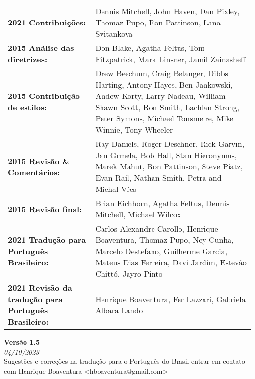 \begin{titlepage}
        \begin{tabular}{ p{6.5cm} p{11.5cm} }
            \textbf{2021 Contribuições:}	& Dennis Mitchell, John Haven, Dan Pixley, Thomaz Pupo, Ron Pattinson, Lana Svitankova \\
            \textbf{2015 Análise das diretrizes:} & Don Blake, Agatha Feltus, Tom Fitzpatrick, Mark Linsner, Jamil Zainasheff \\
            \textbf{2015 Contribuição de estilos:} & Drew Beechum, Craig Belanger, Dibbs Harting, Antony Hayes, Ben Jankowski, Andew Korty,
            Larry Nadeau, William Shawn Scott, Ron Smith, Lachlan Strong, Peter Symons, Michael Tonsmeire, Mike Winnie, Tony Wheeler \\
            \textbf{2015 Revisão \& Comentários:} & Ray Daniels, Roger Deschner, Rick Garvin, Jan Grmela, Bob Hall, Stan Hieronymus, Marek Mahut, Ron Pattinson, Steve Piatz, Evan Rail, Nathan Smith, Petra and Michal Vřes\\
            \textbf{2015 Revisão final:} & Brian Eichhorn, Agatha Feltus, Dennis Mitchell, Michael Wilcox  \\
            \textbf{2021 Tradução para Português Brasileiro:} & Carlos Alexandre Carollo, Henrique Boaventura, Thomaz Pupo, Ney Cunha, Marcelo Destefano, Guilherme Garcia, Mateus Dias Ferreira, Davi Jardim, Estevão Chittó, Jayro Pinto \\
            \textbf{2021 Revisão da tradução para Português Brasileiro:} & Henrique Boaventura, Fer Lazzari, Gabriela Albara Lando
        \end{tabular}
        \vspace{0.5cm}
        \textbf{Versão 1.5}\\
        \footnotesize{\textit{04/10/2023}}\\
        \vspace{0.4cm}
        \footnotesize{Sugestões e correções na tradução para o Português do Brasil entrar em contato com Henrique Boaventura <hboaventura@gmail.com>}

\end{titlepage}
